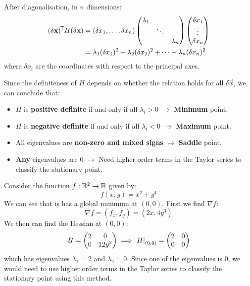 \documentclass[../main.tex]{subfiles}
\begin{document}
After diagonalisation, in $n$ dimensions:
\begin{align*}
  (\delta \mathbf{\bm{x}})^{{\mkern-1.5mu\mathsf{T}}}H(\delta\mathbf{\bm{x}}) &= (\delta x_1, \ldots, \delta x_n)
  \begin{pmatrix}
  \lambda_1 &  &  \\
   & \ddots &  \\
   &  & \lambda_n \\
  \end{pmatrix}
  \begin{pmatrix}
  \delta x_1 \\
  \vdots \\
  \delta x_n \\
  \end{pmatrix} \\
  &= \lambda_1 (\delta x_1)^2 + \lambda_2 (\delta x_2)^2 + \cdots + \lambda_n(\delta x_n)^2
\end{align*}
where $\delta x_i$ are the coordinates with respect to the principal axes.

Since the definiteness of $H$ depends on whether the relation holds for all $\delta \vec{x}$, we can conclude that:
\begin{itemize}
  \item $H$ is \textbf{positive definite} if and only if all $\lambda_i > 0$ $\to$ \textbf{Minimum} point.
  \item $H$ is \textbf{negative definite} if and only if all $\lambda_i < 0$ $\to$ \textbf{Maximum} point.
  \item All eigenvalues are \textbf{non-zero and mixed signs} $\to$ \textbf{Saddle} point.
  \item \textbf{Any} eigenvalues are 0 $\to$ Need higher order terms in the Taylor series to classify the stationary point.
\end{itemize}
\begin{example}
  Consider the function $f: \mathbb{R}^2 \to \mathbb{R}$ given by:
  \[
    f(x, y) = x^2 + y^4
  \]
  We can see that is has a global minimum at $(0, 0)$.
  First we find $\nabla f$:
  \[
    \nabla f = (f_x, f_y) = (2x, 4y^3)
  \]
  We then can find the Hessian at $(0, 0)$:
  \[
    H = \begin{pmatrix}
    2 & 0 \\
    0 & 12y^2 \\
    \end{pmatrix} \implies
    \left. H \right|_{(0, 0)} =
    \begin{pmatrix}
    2 & 0 \\
    0 & 0 \\
    \end{pmatrix}
  \]
  which has eigenvalues $\lambda_1 = 2$ and $\lambda_2 = 0$.
  Since one of the eigenvalues is 0, we would need to use higher order terms in the Taylor series to classify the stationary point using this method.
\end{example}
\end{document}
